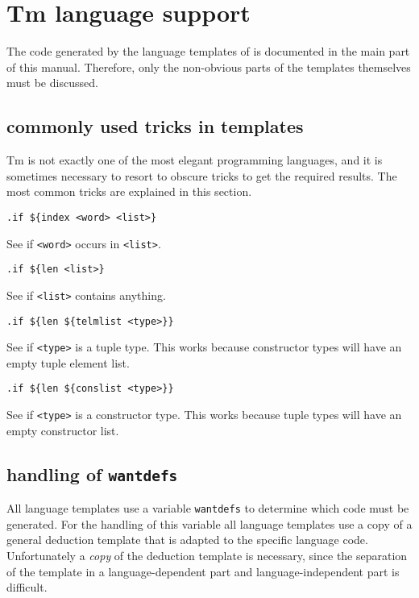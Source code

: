 \section{Tm language support}
The code generated by the language templates of {\Tm} is documented
in the main part of this manual.
Therefore, only the non-obvious parts of the templates themselves
must be discussed.
\subsection{commonly used tricks in templates}
Tm is not exactly one of the most elegant programming languages,
and it is sometimes necessary to resort to obscure tricks to get the
required results.
The most common tricks are explained in this section.
\begin{verbatim}
.if ${index <word> <list>}
\end{verbatim}
See if \verb!<word>! occurs in \verb!<list>!.
\begin{verbatim}
.if ${len <list>}
\end{verbatim}
See if \verb!<list>! contains anything.
\begin{verbatim}
.if ${len ${telmlist <type>}}
\end{verbatim}
See if \verb!<type>! is a tuple type.
This works because constructor types will have an empty tuple
element list.
\begin{verbatim}
.if ${len ${conslist <type>}}
\end{verbatim}
See if \verb!<type>! is a constructor type.
This works because tuple types will have an empty constructor list.
\subsection{handling of {\tt wantdefs}}
All language templates use
a variable {\tt wantdefs} to determine which code must be generated.
For the handling of this variable all language templates use a copy of
a general deduction template that is adapted to the specific language
code.
Unfortunately a {\em copy} of the deduction template is necessary,
since the separation of the template in a language-dependent part and
language-independent part is difficult.

